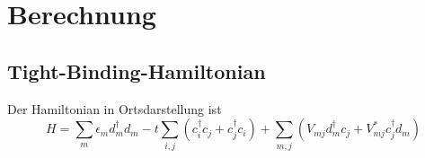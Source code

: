 \section{Berechnung}
\label{sec:berechnung}
\subsection{Tight-Binding-Hamiltonian}
\label{subsec:hamiltonian}
Der Hamiltonian in Ortsdarstellung ist 
\begin{equation}
    H = \sum_m \epsilon_m d_m^\dagger d_m - t \sum_{i,j} \left ( c_i^\dagger c_j + c_j^\dagger c_i \right )
    + \sum_{m,j} \left ( V_{mj} d_m^\dagger c_j + V^*_{mj} c_j^\dagger d_m  \right)
\end{equation}